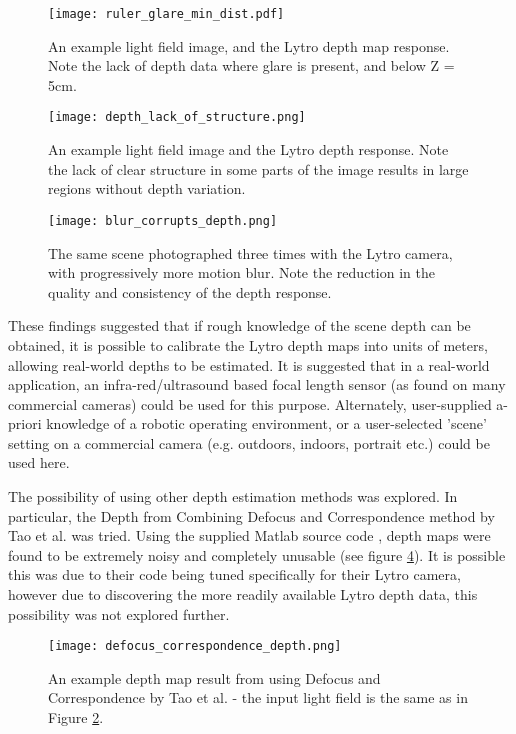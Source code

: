 \begin{figure}
\centering
\texttt{[image: ruler\_glare\_min\_dist.pdf]}
\caption[Minimum depth map distance and the effect of glare]{An example light field image, and the Lytro depth map response. Note the lack of depth data where glare is present, and below Z = 5cm.}
\label{fig:ruler_glare_min_dist}
\end{figure}

\begin{figure}
\centering
\texttt{[image: depth\_lack\_of\_structure.png]}
\caption[Lack of Scene Structure Corrupts Lytro Depth Estimation]{An example light field image and the Lytro depth response. Note the lack of clear structure in some parts of the image results in large regions without depth variation.}
\label{fig:depth_lack_of_structure}
\end{figure}

\begin{figure}
\centering
\texttt{[image: blur\_corrupts\_depth.png]}
\caption[Motion Blur Corrupts Lytro Depth Estimation]{The same scene photographed three times with the Lytro camera, with progressively more motion blur. Note the reduction in the quality and consistency of the depth response.}
\label{fig:blur_corrupts_depth}
\end{figure}

These findings suggested that if rough knowledge of the scene depth can be obtained, it is possible to calibrate the Lytro depth maps into units of meters, allowing real-world depths to be estimated.
It is suggested that in a real-world application, an infra-red/ultrasound based focal length sensor (as found on many commercial cameras) could be used for this purpose.
Alternately, user-supplied a-priori knowledge of a robotic operating environment, or a user-selected 'scene' setting on a commercial camera (e.g. outdoors, indoors, portrait etc.) could be used here.

The possibility of using other depth estimation methods was explored.
In particular, the Depth from Combining Defocus and Correspondence method by Tao et al. \cite{tao2013depth} was tried.
Using the supplied Matlab source code \cite{tao2013depthwebsite}, depth maps were found to be extremely noisy and completely unusable (see figure \ref{fig:defocus_correspondence_depth}).
It is possible this was due to their code being tuned specifically for their Lytro camera, however due to discovering the more readily available Lytro depth data, this possibility was not explored further.


\begin{figure}[h]
\centering
\texttt{[image: defocus\_correspondence\_depth.png]}
\caption[Depth Map from combining Defocus and Correspondence]{An example depth map result from using Defocus and Correspondence by Tao et al. \cite{tao2013depthwebsite} - the input light field is the same as in Figure \ref{fig:depth_lack_of_structure}.}
\label{fig:defocus_correspondence_depth}
\end{figure}
